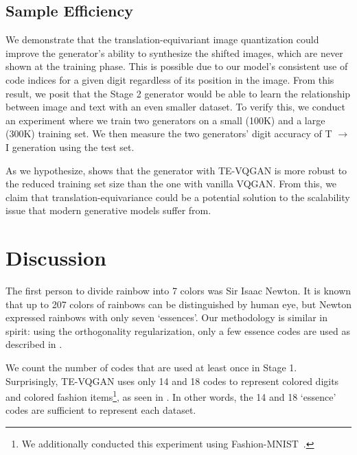 \documentclass{article}
\begin{document}
\vspace{-2mm}
\subsection{Sample Efficiency}
\vspace{-3mm}



\noindent
We demonstrate that the translation-equivariant image quantization could improve the generator's ability to synthesize the shifted images, which are never shown at the training phase.
This is possible due to our model's consistent use of code indices for a given digit regardless of its position in the image.
From this result, we posit that the Stage 2 generator would be able to learn the relationship between image and text with an even smaller dataset. 
To verify this, we conduct an experiment where we train two generators on a small (100K) and a large (300K) training set.
We then measure the two generators' digit accuracy of T $\to$ I generation using the test set.

As we hypothesize,  shows that the generator with TE-VQGAN is more robust to the reduced training set size than the one with vanilla VQGAN.
From this, we claim that translation-equivariance could be a potential solution to the scalability issue that modern generative models suffer from.


\section{Discussion}
\vspace{-2mm}


\noindent
The first person to divide rainbow into 7 colors was Sir Isaac Newton. 
It is known that up to 207 colors of rainbows can be distinguished by human eye, but Newton expressed rainbows with only seven `essences'. 
Our methodology is similar in spirit: using the orthogonality regularization, only a few essence codes are used as described in .

We count the number of codes that are used at least once in Stage 1.
Surprisingly, TE-VQGAN uses only 14 and 18 codes to represent colored digits and colored fashion items\footnote{We additionally conducted this experiment using Fashion-MNIST~\cite{fashionmnist}.}, as seen in .
In other words, the 14 and 18 `essence' codes are sufficient to represent each dataset.
\end{document}
